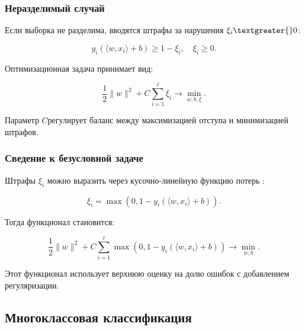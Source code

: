\hypertarget{ux43dux435ux440ux430ux437ux434ux435ux43bux438ux43cux44bux439-ux441ux43bux443ux447ux430ux439}{%
\subsubsection*{Неразделимый
случай}\label{ux43dux435ux440ux430ux437ux434ux435ux43bux438ux43cux44bux439-ux441ux43bux443ux447ux430ux439}}

Если выборка не разделима, вводятся штрафы за нарушения \( \xi_i
\textgreater{} 0 \):

\begin{equation}
y_i (\langle w, x_i \rangle + b) \geq 1 - \xi_i, \quad \xi_i \geq 0.
\end{equation}

Оптимизационная задача принимает вид:

\begin{equation}
\frac{1}{2} \|w\|^2 + C \sum_{i=1}^\ell \xi_i \to \min_{w, b, \xi}.
\end{equation}

Параметр \(C\)регулирует баланс между максимизацией отступа и
минимизацией штрафов.

\hypertarget{ux441ux432ux435ux434ux435ux43dux438ux435-ux43a-ux431ux435ux437ux443ux441ux43bux43eux432ux43dux43eux439-ux437ux430ux434ux430ux447ux435}{%
\subsubsection*{Сведение к безусловной
задаче}\label{ux441ux432ux435ux434ux435ux43dux438ux435-ux43a-ux431ux435ux437ux443ux441ux43bux43eux432ux43dux43eux439-ux437ux430ux434ux430ux447ux435}}

Штрафы \(\xi_i\) можно выразить через кусочно-линейную функцию потерь :

\begin{equation}
\xi_i = \max(0, 1 - y_i (\langle w, x_i \rangle + b)).
\end{equation}

Тогда функционал становится:

\begin{equation}
\frac{1}{2} \|w\|^2 + C \sum_{i=1}^\ell \max(0, 1 - y_i (\langle w, x_i \rangle + b)) \to \min_{w, b}.
\end{equation}

Этот функционал использует верхнюю оценку на долю ошибок с добавлением
регуляризации.

\hypertarget{ux43cux43dux43eux433ux43eux43aux43bux430ux441ux441ux43eux432ux430ux44f-ux43aux43bux430ux441ux441ux438ux444ux438ux43aux430ux446ux438ux44f}{%
\subsection*{Многоклассовая
классификация}\label{ux43cux43dux43eux433ux43eux43aux43bux430ux441ux441ux43eux432ux430ux44f-ux43aux43bux430ux441ux441ux438ux444ux438ux43aux430ux446ux438ux44f}}


